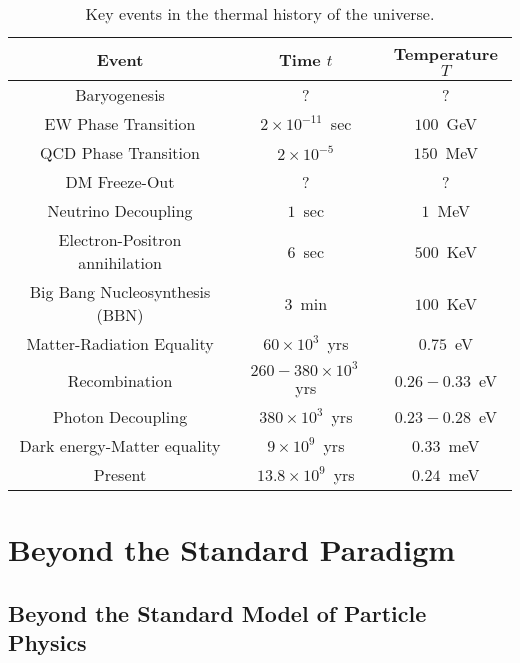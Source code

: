\documentclass[12pt,a4paper]{book}
\begin{document}
\begin{small}
\renewcommand{\arraystretch}{1.6}
\begin{table}[h!]
\begin{center}
\begin{tabular}{ccc}
\hline
Event & Time $t$ & Temperature $T$ \\
\hline
Baryogenesis & ? & ? \\
EW Phase Transition & $2 \times 10^{-11}\,$ sec & $100\,$ GeV \\
QCD Phase Transition & $2 \times 10^{-5}$ & $150\,$ MeV \\
DM Freeze-Out & ? & ? \\
Neutrino Decoupling & $1\,$ sec & $1\,$ MeV \\
Electron-Positron annihilation & $6\,$ sec & $500 \,$ KeV \\
Big Bang Nucleosynthesis (BBN) & $3\,$ min & $100\,$ KeV \\
Matter-Radiation Equality & $60 \times 10^3\,$ yrs & $0.75 \,$ eV \\
Recombination & $260-380 \times 10^3\,$ yrs & $0.26-0.33\,$ eV \\
Photon Decoupling & $380 \times 10^3 \,$ yrs & $0.23-0.28\,$ eV \\
Dark energy-Matter equality & $9 \times 10^9\,$ yrs & $0.33 \,$ meV \\
Present & $13.8 \times 10^9 \,$ yrs & $0.24 \,$ meV \\
\hline
\end{tabular}
\end{center}
\caption{Key events in the thermal history of the universe.}
\label{tab:ThermalHistory}
\end{table}
\end{small}

\section{Beyond the Standard Paradigm}
\label{sec:BSM}

\subsection{Beyond the Standard Model of Particle Physics}
\label{ssec:BSM}
\end{document}
